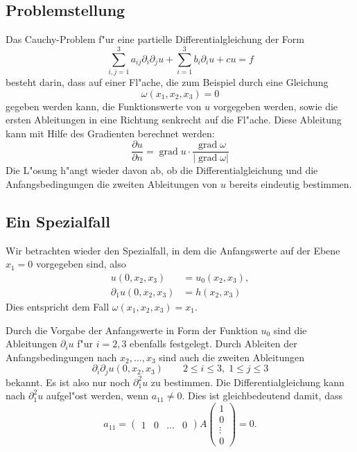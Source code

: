 \subsection{Problemstellung}
Das Cauchy-Problem f"ur eine partielle Differentialgleichung der
Form
\[
\sum_{i,j=1}^3a_{ij}\partial_i\partial_ju+\sum_{i=1}^3b_i\partial_iu+cu=f
\]
besteht darin, dass auf einer Fl"ache, die zum Beispiel durch
eine Gleichung
\[
\omega(x_1,x_2,x_3)=0
\]
gegeben werden kann,
die Funktionswerte von $u$ vorgegeben werden, sowie die ersten
Ableitungen in eine Richtung senkrecht auf die Fl"ache.
Diese Ableitung kann mit Hilfe des Gradienten berechnet werden:
\[
\frac{\partial u}{\partial n}=\operatorname{grad}u\cdot \frac{\operatorname{grad}\omega}{|\operatorname{grad}\omega|}
\]
Die L"osung h"angt wieder davon ab, ob die Differentialgleichung
und die Anfangsbedingungen die zweiten Ableitungen von $u$ bereits
eindeutig bestimmen.

\subsection{Ein Spezialfall}
Wir betrachten wieder den Spezialfall, in dem die Anfangswerte auf der
Ebene $x_1=0$ vorgegeben sind, also
\begin{align*}
u(0,x_2,x_3)&=u_0(x_2,x_3),
\\
\partial_1u(0,x_2,x_3)&=h(x_2,x_3)
\end{align*}
Dies entspricht dem Fall $\omega(x_1,x_2,x_3)=x_1$.

Durch die Vorgabe der Anfangswerte in Form der Funktion $u_0$ sind die Ableitungen
$\partial_iu$ f"ur $i=2,3$ ebenfalls festgelegt.
Durch Ableiten der Anfangsbedingungen nach $x_2,\dots,x_3$
sind auch die zweiten Ableitungen 
\[
\partial_i\partial_ju(0,x_2,x_3)\qquad 2\le i\le 3,\;1\le j\le 3
\]
bekannt. Es ist also nur noch $\partial_1^2u$ zu bestimmen.
Die Differentialgleichung kann nach $\partial_1^2u$ aufgel"ost
werden, wenn $a_{11}\ne 0$. Dies ist gleichbedeutend damit, dass
\[
a_{11}=\begin{pmatrix}
1&0&\dots&0
\end{pmatrix}
A
\begin{pmatrix}1\\0\\\vdots\\0\end{pmatrix}
=0.
\]

